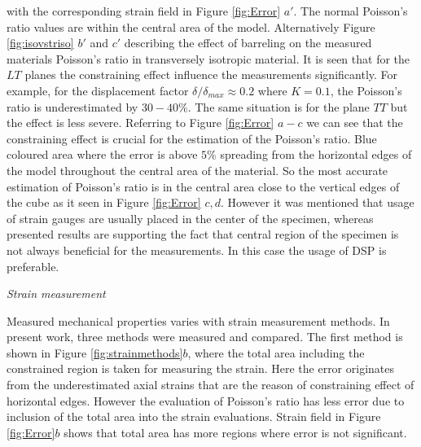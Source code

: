 \documentclass[review]{elsarticle}
\begin{document}
with the corresponding strain field in Figure \ref{fig:Error} $a'$. The normal
Poisson's ratio values are within the central area of the model. 
Alternatively Figure \ref{fig:isovstriso} $b'$ and $c'$ describing the effect
of barreling on the measured materials Poisson's ratio in transversely isotropic material. 
It is seen that for the $LT$ planes the constraining effect influence the
measurements significantly. For example, for the displacement factor $\delta/\delta_{max}\approx0.2 $ where $K=0.1$,  the Poisson's ratio is
underestimated by $30-40\%$.
The same situation is for the plane $TT$ but the effect is less severe.
Referring to Figure \ref{fig:Error} $a-c$  we can see that the constraining effect is
crucial for the estimation of the Poisson's ratio. Blue coloured area where the error is above $5\%$ spreading from the horizontal edges of 
the model throughout the central area of the material. So the most accurate
estimation of Poisson's ratio is in the central area close to the vertical
edges of the cube as it seen in Figure \ref{fig:Error} $c,d$. However it was
mentioned that usage of strain gauges are usually placed in the center of the
specimen, whereas presented results are supporting the fact that central
region of the specimen is not always beneficial for the measurements. In this
case the usage of DSP is preferable. 


\begin{description}
\item{\textit{Strain measurement}}
\end{description}
Measured mechanical properties varies with strain measurement methods. In
present work, three methods were measured and compared. The
first method is shown in Figure \ref{fig:strainmethods}$b$, where the total area
including the constrained region is taken for measuring the strain.  
Here the error originates from the underestimated axial strains that are the
reason of constraining effect of horizontal edges. However the evaluation of
Poisson's ratio has less error due to inclusion of the total area into the
strain evaluations. Strain field in Figure \ref{fig:Error}$b$ shows that total
area has more regions where error is not significant.
\end{document}
